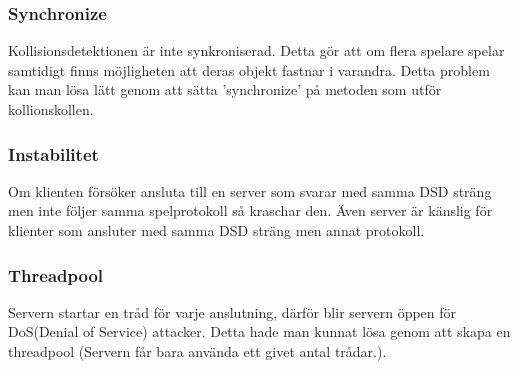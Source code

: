 \documentclass[10pt, titlepage, oneside, a4paper]{article}
\begin{document}
		\subsubsection{Synchronize} Kollisionsdetektionen är inte synkroniserad. Detta gör att om flera spelare spelar samtidigt finns möjligheten att deras objekt fastnar i varandra. Detta problem kan man lösa lätt genom att sätta 'synchronize' på metoden som utför kollionskollen.
		\subsubsection{Instabilitet} Om klienten försöker ansluta till en server som svarar med samma DSD sträng men inte följer samma spelprotokoll så kraschar den. Även server är känslig för klienter som ansluter med samma DSD sträng men annat protokoll.
		\subsubsection{Threadpool} Servern startar en tråd för varje anslutning, därför blir servern öppen för DoS(Denial of Service) attacker. Detta hade man kunnat lösa genom att skapa en threadpool (Servern får bara använda ett givet antal trådar.).
    
    
\end{document}

